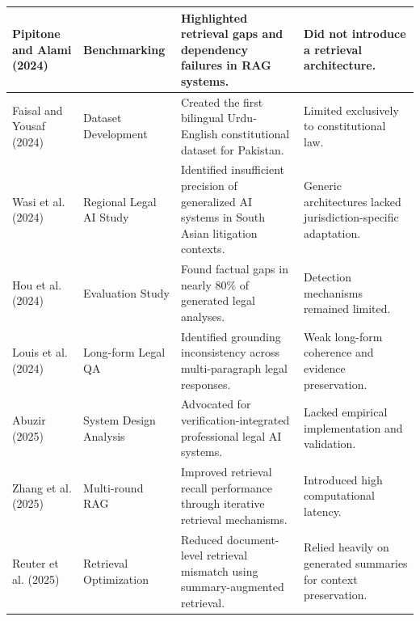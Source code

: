 \documentclass[11pt]{article}
\begin{document}
\begin{table}[H]
\begin{tabularx}{\textwidth}{|>{\raggedright\arraybackslash}p{2.5cm}|>{\raggedright\arraybackslash}p{3.0cm}|>{\raggedright\arraybackslash}X|>{\raggedright\arraybackslash}X|}
Pipitone and Alami (2024) & Benchmarking & Highlighted retrieval gaps and dependency failures in RAG systems. & Did not introduce a retrieval architecture. \\
\hline

Faisal and Yousaf (2024) & Dataset Development & Created the first bilingual Urdu-English constitutional dataset for Pakistan. & Limited exclusively to constitutional law. \\
\hline

Wasi et al. (2024) & Regional Legal AI Study & Identified insufficient precision of generalized AI systems in South Asian litigation contexts. & Generic architectures lacked jurisdiction-specific adaptation. \\
\hline

Hou et al. (2024) & Evaluation Study & Found factual gaps in nearly 80\% of generated legal analyses. & Detection mechanisms remained limited. \\
\hline

Louis et al. (2024) & Long-form Legal QA & Identified grounding inconsistency across multi-paragraph legal responses. & Weak long-form coherence and evidence preservation. \\
\hline

Abuzir (2025) & System Design Analysis & Advocated for verification-integrated professional legal AI systems. & Lacked empirical implementation and validation. \\
\hline

Zhang et al. (2025) & Multi-round RAG & Improved retrieval recall performance through iterative retrieval mechanisms. & Introduced high computational latency. \\
\hline

Reuter et al. (2025) & Retrieval Optimization & Reduced document-level retrieval mismatch using summary-augmented retrieval. & Relied heavily on generated summaries for context preservation. \\
\hline

\end{tabularx}
\end{table}
\end{document}
